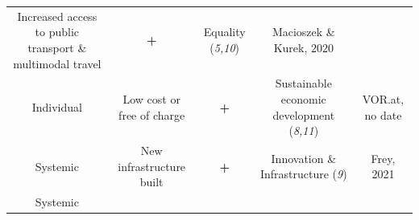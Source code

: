 \documentclass[
]{book}
\begin{document}
\begin{longtable}[]{@{}ccccc@{}}
\begin{minipage}[t]{0.16\columnwidth}
Increased access to public transport \& multimodal travel\strut
\end{minipage} & \begin{minipage}[t]{0.17\columnwidth}\centering
\textbf{+}\strut
\end{minipage} & \begin{minipage}[t]{0.17\columnwidth}\centering
Equality (\emph{5,10})\strut
\end{minipage} & \begin{minipage}[t]{0.17\columnwidth}\centering
Macioszek \& Kurek, 2020\strut
\end{minipage}\tabularnewline
\begin{minipage}[t]{0.17\columnwidth}\centering
Individual\strut
\end{minipage} & \begin{minipage}[t]{0.16\columnwidth}\centering
Low cost or free of charge\strut
\end{minipage} & \begin{minipage}[t]{0.17\columnwidth}\centering
\textbf{+}\strut
\end{minipage} & \begin{minipage}[t]{0.17\columnwidth}\centering
Sustainable economic development (\emph{8,11})\strut
\end{minipage} & \begin{minipage}[t]{0.17\columnwidth}\centering
VOR.at, no date\strut
\end{minipage}\tabularnewline
\begin{minipage}[t]{0.17\columnwidth}\centering
Systemic\strut
\end{minipage} & \begin{minipage}[t]{0.16\columnwidth}\centering
New infrastructure built\strut
\end{minipage} & \begin{minipage}[t]{0.17\columnwidth}\centering
\textbf{+}\strut
\end{minipage} & \begin{minipage}[t]{0.17\columnwidth}\centering
Innovation \& Infrastructure (\emph{9})\strut
\end{minipage} & \begin{minipage}[t]{0.17\columnwidth}\centering
Frey, 2021\strut
\end{minipage}\tabularnewline
\begin{minipage}[t]{0.17\columnwidth}\centering
Systemic\strut
\end{minipage} & \begin{minipage}[t]{0.16\columnwidth}\centering

\end{minipage}
\end{longtable}
\end{document}
